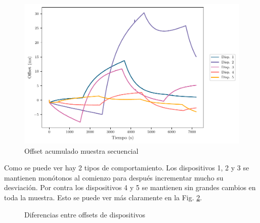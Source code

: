 \begin{figure}[htpb!]
    \centering
    \includegraphics[scale=0.65]{../Python/plots/individual/offset_plot}
    \caption{Offset acumulado muestra secuencial}
    \label{fig:off_acu_secuencial}
\end{figure}

Como se puede ver hay 2 tipos de comportamiento. Los dispositivos 1, 2 y 3 se mantienen monótonos al comienzo para después incrementar mucho su desviación. Por contra los dispositivos 4 y 5 se mantienen sin grandes cambios en toda la muestra. Esto se puede ver más claramente en la Fig. \ref{fig:off_acu_secuencial_diffs}.

\begin{figure}[htpb!]
    \centering
    \quad
    \caption{Diferencias entre offsets de dispositivos}
    \label{fig:off_acu_secuencial_diffs}
\end{figure}

